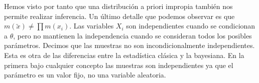 Hemos visto por tanto que una distribución a priori impropia también nos permite realizar inferencia. Un último detalle que podemos observar es que $m(\utilde{x}) \ne \prod{m(x_i)}$. Las variables $X_i$ son independientes cuando se condicionan a $\theta$, pero no mantienen la independencia cuando se consideran todos los posibles parámetros. Decimos que las muestras no son incondicionalmente independientes. Esta es otra de las diferencias entre la estadística clásica y la bayesiana. En la primera bajo cualquier concepto las muestras son independientes ya que el parámetro es un valor fijo, no una variable aleatoria.  %

\begin{comment}
\begin{ex}
	Cálculo de marginales en una distribución de Poisson con $ f(x_i|\lambda) = \frac{e^{-\lambda} \lambda ^{x_i}}{x_i!}, \lambda > 0 $ y $ x_i = 0,1,2, ... $
	\\En primer lugar calculamos la distribución a priori de Jeffreys $\Pi^y (\theta) = I_X(\theta)^{\frac{1}{2}} $. Por tanto, para nuestra función de distribución  $\Pi^y (\theta) = - \lambda ^{-\frac{1}{2}} $, pero para que sea una distribución de probabilidad tendremos que normalizarla, para ello hacemos $\Pi^y (\theta) = - \lambda ^{-\frac{1}{2}} c $, ahora bien, esta función no se puede normalizar dado que $\int_{0}^{\infty} c \lambda^\frac{1}{2} d\lambda = \infty $

	No estoy segura de por qué pero esto se puede hacer. De todas formas, podemos calcular la distribución a posteriori, para ello consideramos $f(x|  \lambda) =  \frac{e^{-\lambda} \lambda ^{\sum{x_i}}} {\prod{x_i!}}  , x = (x_1, x_2, ...) $.

	Podemos calcular la distribución marginal de x, $f(x) = \frac{c}{\prod_{i^=1}^{n}{x_i}} \int_{0}^{\infty} {e^{-n\lambda} \lambda^{\sum{x_i} - \frac{1}{2}} d\lambda} =  \left [ y = n \lambda , dy = nd\lambda \right ]  = \frac{c}{n ^{\sum{x_i} + \frac{1}{2}}\prod_{i^=1}^{n}{x_i}} \int_{0}^{\infty} {e^{-y} y^{\sum{x_i}-\frac{1}{2} } dy } = \frac{c}{n ^{\sum{x_i} + \frac{1}{2}}}\Gamma(\sum{x_i} + \frac{1}{2}) $

	Como, $f(x) != \prod f(x_i)$, concluimos que las variables no son incondicionalmente independientes si no condicionalmente independientes.

	Podemos observar que la distribución marginal de x está indeterminada por $c$. A pesar de ello, podemos calcular la distribución a posteriori de la siguiente forma:
	$f(\lambda, x) = \frac{ \frac{c e^{-n \lambda} \lambda{\sum{x_i} - \frac{1}{2}} }{x_1! x_2! ... x_n!} }{\frac{c}{x_1! ... x_n!} \frac{1}{n \sum{x_i} + \frac{1}{2} \Gamma(\sum{x_i} + \frac{1}{2})}} = \frac{e^{-n\lambda} \lambda^{\sum{x_i} - \frac{1}{2}} n^{\sum{x_i} + \frac{1}{2}}}{\Gamma(\sum{x_i} + \frac{1}{2})}$
\end{ex}
\end{comment}

